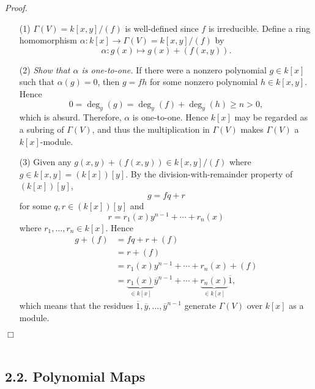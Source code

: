 \documentclass{article}
\begin{document}
\emph{Proof.}
\begin{enumerate}
\item[(1)]
  $\Gamma(V) = k[x,y]/(f)$ is well-defined since $f$ is irreducible.
  Define a ring homomorphism $\alpha: k[x] \to \Gamma(V) = k[x,y]/(f)$
  by
  \[
    \alpha: g(x) \mapsto g(x) + (f(x,y)).
  \]

\item[(2)]
  \emph{Show that $\alpha$ is one-to-one.}
  If there were a nonzero polynomial $g \in k[x]$ such that $\alpha(g) = 0$,
  then $g = fh$ for some nonzero polynomial $h \in k[x,y]$.
  Hence
  \[
    0 = \deg_y(g) = \deg_y(f) + \deg_y(h) \geq n > 0,
  \]
  which is absurd. Therefore, $\alpha$ is one-to-one.
  Hence $k[x]$ may be regarded as a subring of $\Gamma(V)$,
  and thus the multiplication in $\Gamma(V)$
  makes $\Gamma(V)$ a $k[x]$-module.

\item[(3)]
  Given any $g(x,y) + (f(x,y)) \in k[x,y]/(f)$ where $g \in k[x,y] = (k[x])[y]$.
  By the division-with-remainder property of $(k[x])[y]$,
  \[
    g = fq + r
  \]
  for some $q, r \in (k[x])[y]$ and
  \[
    r = r_1(x) y^{n-1} + \cdots + r_n(x)
  \]
  where $r_1, \ldots, r_n \in k[x]$.
  Hence
  \begin{align*}
    g + (f)
    &= fq + r + (f) \\
    &= r + (f) \\
    &= r_1(x) y^{n-1} + \cdots + r_n(x) + (f) \\
    &= \underbrace{r_1(x)}_{\in k[x]} \overline{y}^{n-1} + \cdots
      + \underbrace{r_n(x)}_{\in k[x]} \overline{1},
  \end{align*}
  which means that
  the residues $\overline{1}, \overline{y}, \ldots, \overline{y}^{n-1}$
   generate $\Gamma(V)$ over $k[x]$ as a module.
\end{enumerate}
$\Box$ \\\\






\subsection*{2.2. Polynomial Maps \\}
\end{document}
